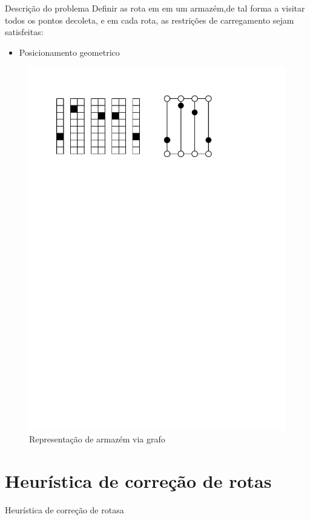 \documentclass[12pt]{beamer}
\begin{document}
	\begin{frame}{Descri\c{c}\~ao do problema}
	Definir as rota em em um armaz\'em,de tal forma a visitar todos os pontos decoleta, e em cada rota, as restri\c{c}\~oes de carregamento sejam satisfeitas:
	\begin{itemize}
		\item Posicionamento geometrico
	\end{itemize}
	\begin{figure}
		\pause
		\includegraphics[width=1\linewidth]{CD_1}
		\caption{Representa\c{c}\~ao de armaz\'em via grafo}
		
	\end{figure}

	\end{frame}


\section{Heur\'istica de corre\c{c}\~ao de rotas} %
	\begin{frame}{Heur\'istica de corre\c{c}\~ao de rotasa}
\end{frame}
\end{document}
